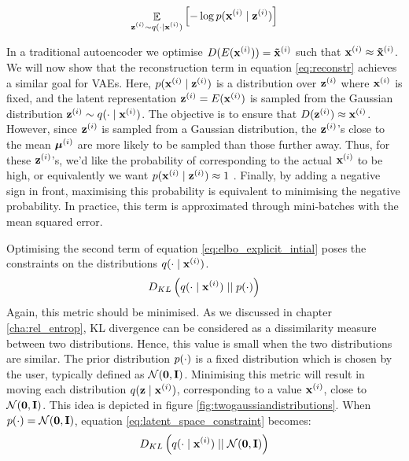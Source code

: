 	\begin{equation}
		\mathop{\mathbb{E}}_{\substack{\mathbf{z}^{(i)} \sim q (\cdot \mid \mathbf{x}^{(i)})}} \left[ -\log p (\mathbf{x}^{(i)} \mid \mathbf{z}^{(i)}) \right] \label{eq:reconstr}	
	\end{equation}

	In a traditional autoencoder we optimise $D(E(\mathbf{x}^{(i)})) = \mathbf{\tilde{x}}^{(i)}$ such that $\mathbf{x}^{(i)} \approx \mathbf{\tilde{x}}^{(i)}$. We will now show that the reconstruction term in equation \ref{eq:reconstr} achieves a similar goal for VAEs. Here, $p (\mathbf{x}^{(i)} \mid \mathbf{z}^{(i)})$ is a distribution over $\mathbf{z}^{(i)}$ where $\mathbf{x}^{(i)}$ is fixed, and the latent representation $\mathbf{z}^{(i)} = E(\mathbf{x}^{(i)})$ is sampled from the Gaussian distribution $\mathbf{z}^{(i)} \sim q (\cdot \mid \mathbf{x}^{(i)})$. The objective is to ensure that $D(\mathbf{z}^{(i)}) \approx \mathbf{x}^{(i)}$. However, since $\mathbf{z}^{(i)}$ is sampled from a Gaussian distribution, the $\mathbf{z}^{(i)}$'s close to the mean $\bm{\mu}^{(i)}$ are more likely to be sampled than those further away. Thus, for these $\mathbf{z}^{(i)}$'s, we'd like the probability of corresponding to the actual $\mathbf{x}^{(i)}$ to be high, or equivalently we want $p (\mathbf{x}^{(i)} \mid \mathbf{z}^{(i)}) \approx 1$ \citep{cinelliVariationalMethodsMachine2021}. Finally, by adding a negative sign in front, maximising this probability is equivalent to minimising the negative probability. In practice, this term is approximated through mini-batches with the mean squared error. %
	

	Optimising the second term of equation \ref{eq:elbo_explicit_intial} poses the constraints on the distributions $q (\cdot \mid \mathbf{x}^{(i)})$. 
	\begin{equation}
		D_{KL} \left(  q (\cdot \mid \mathbf{x}^{(i)})  \mid \mid  p(\cdot)  \right) \label{eq:latent_space_constraint}		
	\end{equation}
	Again, this metric should be minimised. As we discussed in chapter \ref{cha:rel_entrop}, KL divergence can be considered as a dissimilarity measure between two distributions. Hence, this value is small when the two distributions are similar. The prior distribution $p(\cdot)$ is a fixed distribution which is chosen by the user, typically defined as $\mathcal{N}(\bm{\mathbf{0}}, \mathbf{I})$. Minimising this metric will result in moving each distribution $q (\mathbf{z} \mid \mathbf{x}^{(i)})$, corresponding to a value $\mathbf{x}^{(i)}$, close to $\mathcal{N}(\bm{\mathbf{0}}, \mathbf{I})$. This idea is depicted in figure \ref{fig:twogaussiandistributions}. When $p(\cdot) = \mathcal{N}(\bm{\mathbf{0}}, \mathbf{I})$, equation \ref{eq:latent_space_constraint} becomes:
	$$D_{KL} \left(  q (\cdot \mid \mathbf{x}^{(i)})  \mid \mid  \mathcal{N}(\bm{\mathbf{0}}, \mathbf{I})  \right)$$
	
